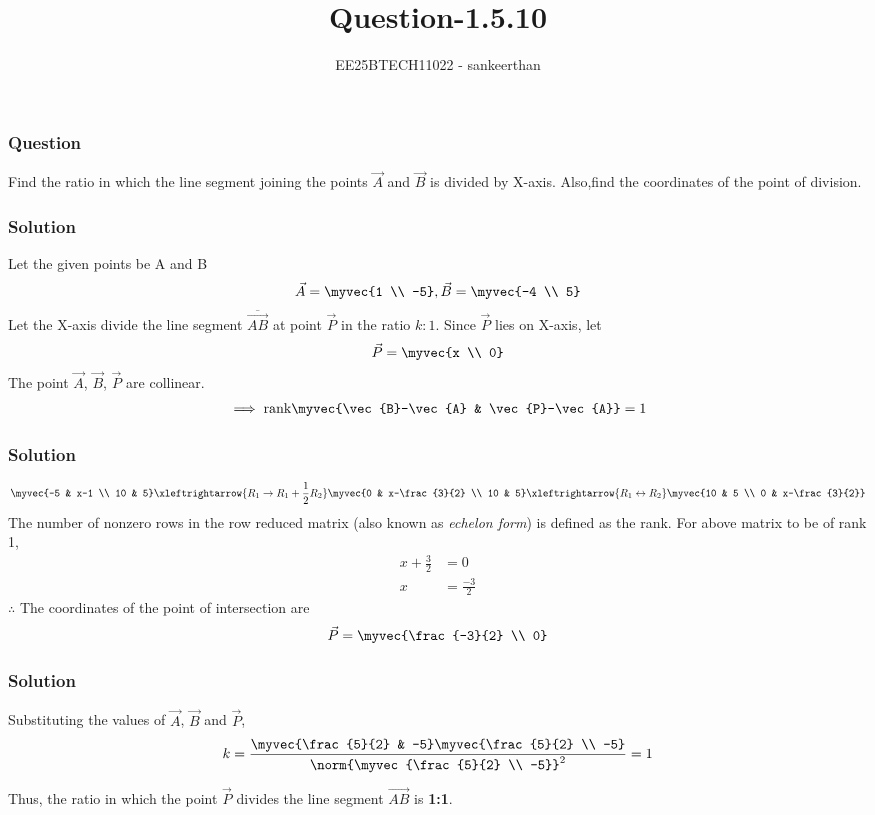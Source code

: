 \documentclass{beamer}
\title{Question-1.5.10}
\author{EE25BTECH11022 - sankeerthan}
\date{}
\begin{document}
\frame{\titlepage}

\begin{frame}
\frametitle{Question}
Find the ratio in which the line segment joining the points $\vec{A}$ and $\vec{B}$ is divided by X-axis. Also,find the coordinates of the  point of division.
\end{frame}

\begin{frame}
\frametitle{Solution}
Let the given points be A and B
\begin{align*} \vec{A} = \myvec{1 \\ -5}, \vec{B} = \myvec{-4 \\ 5} \end{align*}
Let the X-axis divide the line segment \(\overline{\vec{AB}}\) at point $\vec{P}$ in the ratio $k:1$.
Since $\vec{P}$ lies on X-axis, let
\begin{align*}
\vec{P} = \myvec{x \\ 0}
\end{align*}
The point $\vec{A}$, $\vec{B}$, $\vec{P}$ are collinear.
\begin{align}
\implies \text{rank}\myvec{\vec{B}-\vec{A} & \vec{P}-\vec{A}} = 1
\end{align}
\end{frame}

\begin{frame}
\frametitle{Solution}
\begin{align}
\myvec{-5 & x-1 \\ 10 & 5} \xleftrightarrow{R_1 \rightarrow {R_1 + \frac{1}{2}R_2}}\myvec{0 & x-\frac{3}{2} \\ 10 & 5} \xleftrightarrow{R_1 \leftrightarrow R_2}  \myvec{10 & 5 \\ 0 & x-\frac{3}{2}} 
\end{align}
The number of nonzero rows in the row reduced matrix (also known as {\em echelon form}) is defined as the rank. For above matrix to be of rank 1,
\begin{align}
x+\frac{3}{2} &= 0 \\
x &= \frac{-3}{2}
\end{align}
$\therefore$ The coordinates of the point of intersection are 
\begin{align*}
\vec{P} = \myvec{\frac{-3}{2} \\ 0}
\end{align*}
\end{frame}

\begin{frame}
\frametitle{Solution}
Substituting the values of $\vec{A}$, $\vec{B}$ and $\vec{P}$,
\begin{align}
k=\frac{\myvec{\frac{5}{2} & -5}\myvec{\frac{5}{2} \\ -5}}{\norm{\myvec{\frac{5}{2} \\ -5}}^2}=1
\end{align}

Thus, the ratio in which the point $\vec{P}$ divides the line segment $\vec{AB}$ is \textbf{1:1}. 
\end{frame}
\end{document}
